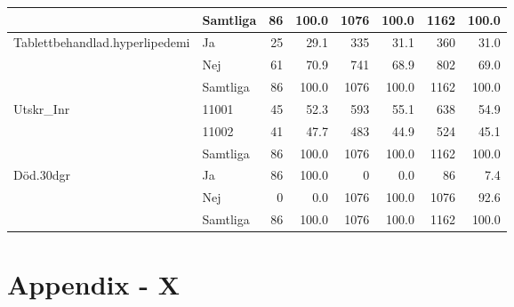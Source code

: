 \begin{table}[ht]
{\begin{tabular}{ll|rr|rr|rr}
   \hline
 & Samtliga & 86 & 100.0 & 1076 & 100.0 & 1162 & 100.0 \\ 
   \hline
\hline
Tablettbehandlad.hyperlipedemi & Ja & 25 & 29.1 & 335 & 31.1 & 360 & 31.0 \\ 
   & Nej & 61 & 70.9 & 741 & 68.9 & 802 & 69.0 \\ 
   \hline
 & Samtliga & 86 & 100.0 & 1076 & 100.0 & 1162 & 100.0 \\ 
   \hline
\hline
Utskr\_Inr & 11001 & 45 & 52.3 & 593 & 55.1 & 638 & 54.9 \\ 
   & 11002 & 41 & 47.7 & 483 & 44.9 & 524 & 45.1 \\ 
   \hline
 & Samtliga & 86 & 100.0 & 1076 & 100.0 & 1162 & 100.0 \\ 
   \hline
\hline
Död.30dgr & Ja & 86 & 100.0 & 0 & 0.0 & 86 & 7.4 \\ 
   & Nej & 0 & 0.0 & 1076 & 100.0 & 1076 & 92.6 \\ 
   \hline
 & Samtliga & 86 & 100.0 & 1076 & 100.0 & 1162 & 100.0 \\ 
   \hline
\hline
\end{tabular}
}
\end{table}


\newpage
\section{Appendix - X }

